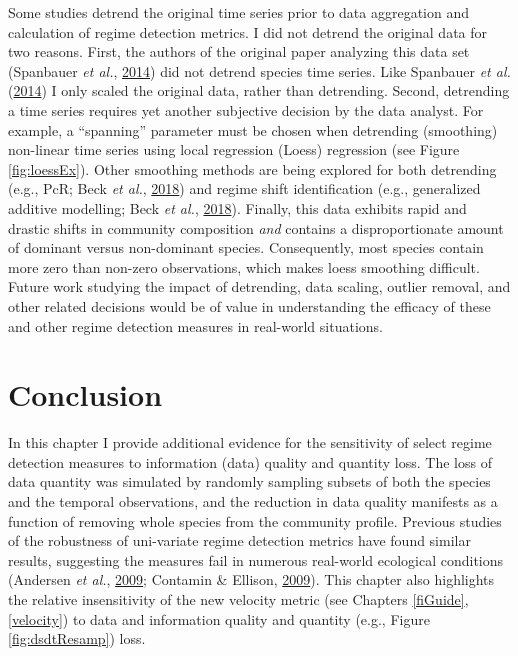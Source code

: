 \documentclass[12pt,twoside,openany]{reedthesis}
\begin{document}
Some studies detrend the original time series prior to data aggregation and calculation of regime detection metrics. I did not detrend the original data for two reasons. First, the authors of the original paper analyzing this data set (Spanbauer \emph{et al.}, \protect\hyperlink{ref-spanbauer_prolonged_2014}{2014}) did not detrend species time series. Like Spanbauer \emph{et al.} (\protect\hyperlink{ref-spanbauer_prolonged_2014}{2014}) I only scaled the original data, rather than detrending. Second, detrending a time series requires yet another subjective decision by the data analyst. For example, a ``spanning'' parameter must be chosen when detrending (smoothing) non-linear time series using local regression (Loess) regression (see Figure \ref{fig:loessEx}). Other smoothing methods are being explored for both detrending (e.g., PcR; Beck \emph{et al.}, \protect\hyperlink{ref-beck_variance_2018}{2018}) and regime shift identification (e.g., generalized additive modelling; Beck \emph{et al.}, \protect\hyperlink{ref-beck_variance_2018}{2018}). Finally, this data exhibits rapid and drastic shifts in community composition \emph{and} contains a disproportionate amount of dominant versus non-dominant species. Consequently, most species contain more zero than non-zero observations, which makes loess smoothing difficult. Future work studying the impact of detrending, data scaling, outlier removal, and other related decisions would be of value in understanding the efficacy of these and other regime detection measures in real-world situations.

\hypertarget{conclusion}{%
\section{Conclusion}\label{conclusion}}

In this chapter I provide additional evidence for the sensitivity of select regime detection measures to information (data) quality and quantity loss. The loss of data quantity was simulated by randomly sampling subsets of both the species and the temporal observations, and the reduction in data quality manifests as a function of removing whole species from the community profile. Previous studies of the robustness of uni-variate regime detection metrics have found similar results, suggesting the measures fail in numerous real-world ecological conditions (Andersen \emph{et al.}, \protect\hyperlink{ref-andersen_ecological_2009}{2009}; Contamin \& Ellison, \protect\hyperlink{ref-contamin_indicators_2009}{2009}). This chapter also highlights the relative insensitivity of the new velocity metric (see Chapters \ref{fiGuide}, \ref{velocity}) to data and information quality and quantity (e.g., Figure \ref{fig:dsdtResamp}) loss.
\end{document}
